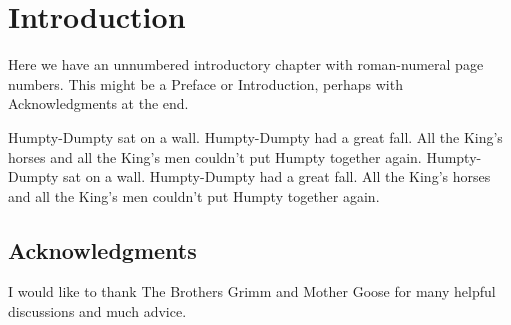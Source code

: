 
\chapter{Introduction}


Here we have an unnumbered introductory chapter with roman-numeral
page numbers.  This might be a Preface or Introduction, perhaps with
Acknowledgments at the end.

Humpty-Dumpty sat on a wall.  Humpty-Dumpty had a great fall.  All
the King's horses and all the King's men couldn't put Humpty together
again.  Humpty-Dumpty sat on a wall.  Humpty-Dumpty had a great fall.
All the King's horses and all the King's men couldn't put Humpty
together again.



\section*{Acknowledgments}

I would like to thank The Brothers Grimm and Mother Goose for many
helpful discussions and much advice.

